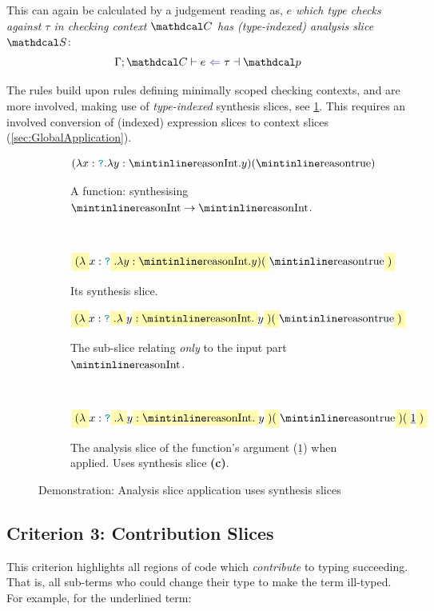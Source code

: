 This can again be calculated by a judgement reading as, \textit{$e$ which type checks against $\tau$ in checking context $\C$ has (type-indexed) analysis slice $\S$}:
\[\analysisslice{\C}{e}{\tau}{\p}\]

The rules build upon rules defining minimally scoped checking contexts, and are more involved, making use of \textit{type-indexed} synthesis slices, see \cref{fig:AnalysisSliceApplication}. This requires an involved conversion of (indexed) expression slices to context slices (\cref{sec:GlobalApplication}).
\begin{figure}[h]
\centering
\begin{subfigure}{0.4\textwidth}
\[(\lambda x : \dyn. \lambda y : \code{Int}. y)(\code{true})\]
\caption{A function: synthesising $\code{Int} \to \code{Int}$.}
\end{subfigure}$\qquad$
\begin{subfigure}{0.4\textwidth}
\[\hlcmaths[yellow!30]{(\lambda} x : \dyn\hlcmaths[yellow!30]{. \lambda y : \code{Int}. y)(}\code{true}\hlcmaths[yellow!30]{)}\]
\caption{Its synthesis slice.}
\end{subfigure}
\begin{subfigure}{0.4\textwidth}
\[\hlcmaths[yellow!30]{(\lambda} x : \dyn\hlcmaths[yellow!30]{. \lambda} y \hlcmaths[yellow!30]{: \code{Int}.} y\hlcmaths[yellow!30]{)(}\code{true}\hlcmaths[yellow!30]{)}\]
\caption{The sub-slice relating \textit{only} to the input part $\code{Int}$.}
\end{subfigure}$\qquad$
\begin{subfigure}{0.4\textwidth}
\[\hlcmaths[yellow!30]{(\lambda} x : \dyn\hlcmaths[yellow!30]{. \lambda} y \hlcmaths[yellow!30]{: \code{Int}.} y\hlcmaths[yellow!30]{)(}\code{true}\hlcmaths[yellow!30]{)(}\underline{1}\hlcmaths[yellow!30]{)}\]
\caption{The analysis slice of the function's argument ($\underline{1}$) when applied. Uses synthesis slice \textbf{(c)}.}
\end{subfigure}
\caption{Demonstration: Analysis slice application uses synthesis slices}
\label{fig:AnalysisSliceApplication}
\end{figure}

\subsection{Criterion 3: Contribution Slices}
\label{sec:ContributionSlices}
This criterion highlights all regions of code which \textit{contribute} to typing succeeding. That is, all sub-terms who could change their type to make the term ill-typed. For example, for the underlined term:

